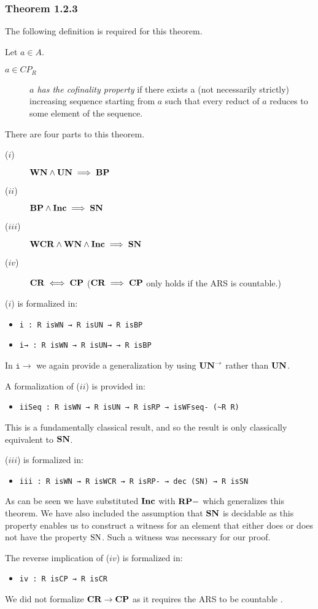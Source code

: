\subsubsection{Theorem 1.2.3}
The following definition is required for this theorem.
\begin{definition} Let $a \in A$.
    \begin{description}
        \item[$a \in CP_R$] \emph{$a$ has the cofinality property} if there exists a 
        (not necessarily strictly) increasing sequence starting from $a$ such that every
        reduct of $a$ reduces to some element of the sequence.
    \end{description}
\end{definition}

There are four parts to this theorem. 
\begin{description}
    \item[($i$)] $\mathbf{WN} \land \mathbf{UN} \implies \mathbf{BP}$
    \item[($ii$)] $\mathbf{BP} \land \mathbf{Inc} \implies \mathbf{SN}$  
    \item[($iii$)] $\mathbf{WCR} \land \mathbf{WN} \land \mathbf{Inc} \implies \mathbf{SN}$
    \item[($iv$)] $\mathbf{CR} \iff \mathbf{CP}$ ($\mathbf{CR} \implies \mathbf{CP}$ only holds if the ARS is countable.)
\end{description}
($i$) is formalized in: 
\begin{itemize}
    \item \verb|i : R isWN → R isUN → R isBP|
    \item \verb|i→ : R isWN → R isUN→ → R isBP|
\end{itemize}
In $\mathtt{i\to}$ we again provide a generalization by using $\mathbf{UN}^{\to}$ rather than $\mathbf{UN}$.

A formalization of ($ii$) is provided in: 
\begin{itemize}
    \item \verb|iiSeq : R isWN → R isUN → R isRP → isWFseq- (~R R)|
\end{itemize}
This is a fundamentally classical result, and so the result is only classically equivalent to $\mathbf{SN}$.

($iii$) is formalized in: 
\begin{itemize}
    \item \verb|iii : R isWN → R isWCR → R isRP- → dec (SN) → R isSN|
\end{itemize}
As can be seen we have substituted $\mathbf{Inc}$ with $\mathbf{RP-}$ which generalizes this theorem. We have also included the assumption that $\mathbf{SN}$ 
is decidable as this property enables us 
to construct a witness for an element that either does or does not have the property $\mathrm{SN}$. Such a witness was necessary for our proof. 


The reverse implication of ($iv$) is formalized in: 
\begin{itemize}
    \item \verb|iv : R isCP → R isCR|
\end{itemize}
We did not formalize $\mathbf{CR} \to \mathbf{CP}$ as it requires the ARS to be countable .


